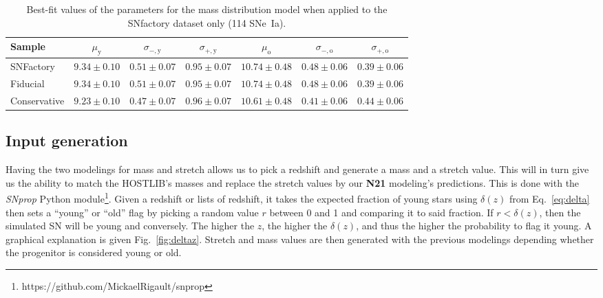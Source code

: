 \documentclass[../main/main.tex]{subfiles}
\begin{document}
\begin{table*}
    \centering
    \caption{Best-fit values of the parameters for the mass distribution
    model when applied to the SNfactory dataset only (114 SNe~Ia).}
    \label{tab:modelresults}
    \begin{tabular}{lcccccc}
        \toprule
        Sample  & $\mu_\mathrm{y} $ &
                $\sigma_{-,\mathrm{y}}$ & $\sigma_{+,\mathrm{y}}$
                & $\mu_\mathrm{o} $ &
                $\sigma_{-,\mathrm{o}}$ & $\sigma_{+,\mathrm{o}}$ \\[0.2em]
        \midrule
        SNFactory     & $ 9.34 \pm 0.10 $
                      & $0.51 \pm 0.07 $ & $0.95 \pm 0.07 $
                      & $10.74 \pm 0.48 $
                      & $ 0.48 \pm 0.06 $ & $0.39 \pm 0.06 $ \\
        Fiducial      & $ 9.34 \pm 0.10 $
                      & $0.51 \pm 0.07 $ & $0.95 \pm 0.07 $
                      & $10.74 \pm 0.48 $
                      & $ 0.48 \pm 0.06 $ & $0.39 \pm 0.06 $ \\
        Conservative  & $ 9.23 \pm 0.10 $
                      & $0.47 \pm 0.07 $ & $0.96 \pm 0.07 $
                      & $10.61 \pm 0.48 $
                      & $ 0.41 \pm 0.06 $ & $0.44 \pm 0.06 $ \\
        \bottomrule
    \end{tabular}
\end{table*}

\subsection{Input generation}\label{ssec:inpgen}

Having the two modelings for mass and stretch allows us to pick a redshift and
generate a mass and a stretch value. This will in turn give us the ability to
match the HOSTLIB's masses and replace the stretch values by our \textbf{N21}
modeling's predictions. This is done with the \textit{SNprop} Python
module\footnote{https://github.com/MickaelRigault/snprop}. Given a redshift or
lists of redshift, it takes the expected fraction of young stars using
$\delta(z)$ from Eq.~\ref{eq:delta} then sets a ``young'' or ``old'' flag by
picking a random value $r$ between 0 and 1 and comparing it to said fraction. If
$r < \delta(z)$, then the simulated SN will be young and conversely. The higher
the $z$, the higher the $\delta(z)$, and thus the higher the probability to flag
it young. A graphical explanation is given Fig.~\ref{fig:deltaz}. Stretch and
mass values are then generated with the previous modelings depending whether the
progenitor is considered young or old.
\end{document}
